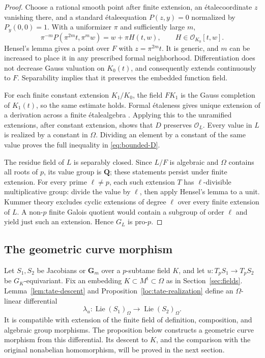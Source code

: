 \documentclass[11pt,a4paper]{article}
\numberwithin{equation}{section}
\theoremstyle{plain}
\theoremstyle{definition}
\theoremstyle{remark}
\newcommand{\Gm}{\mathbf G_m}
\newcommand{\cO}{\mathcal O}
\newcommand{\etale}{\'etale}
\newcommand{\tame}{\mathrm{t}}
\DeclareMathOperator{\Lie}{Lie}
\newcommand{\stacks}[1]{\href{https://stacks.math.columbia.edu/tag/#1}{\texttt{#1}}}
\begin{document}
\begin{proof}
Choose a rational smooth point after finite extension, an \etale coordinate
$z$ vanishing there, and a standard \etale equation $P(z,y)=0$ normalized
by $P_y(0,0)=1$. With a uniformizer $\pi$ and sufficiently large $m$,
\[
 \pi^{-m}P(\pi^{2m}t,\pi^m w)=w+\pi H(t,w),
                 \qquad H\in\cO_{K_0}[t,w].
\]
Hensel's lemma gives a point over $F$ with $z=\pi^{2m}t$. It is generic,
and $m$ can be increased to place it in any prescribed formal
neighborhood. Differentiation does not decrease Gauss valuation on
$K_0(t)$, and consequently extends continuously to $F$. Separability
implies that it preserves the embedded function field.

For each finite constant extension $K_1/K_0$, the field $FK_1$ is the
Gauss completion of $K_1(t)$, so the same estimate holds. Formal
\'etaleness gives unique extension of a derivation across a finite
\etale algebra \cite[Tag~\stacks{00UR}]{Stacks}. Applying this to the unramified
extensions, after constant extension, shows that $D$ preserves
$\cO_L$. Every value in $L$ is realized by a constant in $\Omega$.
Dividing an element by a constant of the same value proves the full
inequality in \eqref{eq:bounded-D}.

The residue field of $L$ is separably closed. Since $L/F$ is algebraic
and $\Omega$ contains all roots of $p$, its value group is $\mathbf Q$;
these statements persist under finite extension. For every prime
$\ell\ne p$, each such extension $T$ has $\ell$-divisible multiplicative
group: divide the value by $\ell$, then apply Hensel's lemma to a unit.
Kummer theory excludes cyclic extensions of degree $\ell$ over every
finite extension of $L$. A non-$p$ finite Galois quotient would contain
a subgroup of order $\ell$ and yield just such an extension. Hence $G_L$
is pro-$p$.
\end{proof}

\subsection{The geometric curve morphism}

Let $S_1,S_2$ be Jacobians or $\Gm$ over a $p$-subtame field $K$, and
let $u:T_pS_1\to T_pS_2$ be $G_K$-equivariant. Fix an embedding
$K\subset M^{\tame}\subset\Omega$ as in Section~\ref{sec:fields}.
Lemma~\ref{lem:tate-descent} and Proposition~\ref{loc:tate-realization}
define an $\Omega$-linear differential
\begin{equation}
 \lambda_u:\Lie(S_1)_\Omega\longrightarrow\Lie(S_2)_\Omega.
 \label{eq:lambda}
\end{equation}
It is compatible with extension of the finite field of definition,
composition, and algebraic group morphisms. The proposition below
constructs a geometric curve morphism from this differential. Its
descent to $K$, and the comparison with the original nonabelian
homomorphism, will be proved in the next section.
\end{document}
